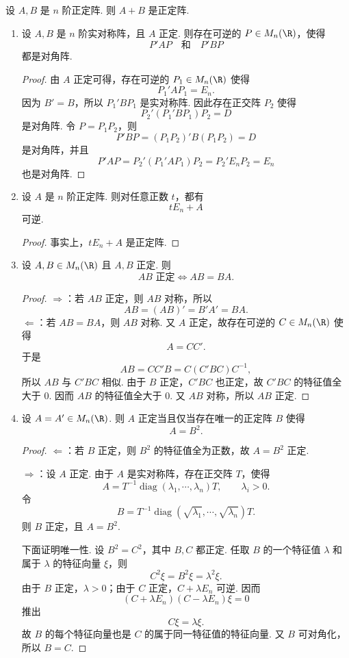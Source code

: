 \begin{lemma}
	设 $A,B$ 是 $n$ 阶正定阵. 则 $A+B$ 是正定阵.
\end{lemma}
\begin{example}
	\begin{enumerate}
		\item 设 $A,B$ 是 $n$ 阶实对称阵，且 $A$ 正定. 则存在可逆的 $P\in M_n(\R)$，使得
		\[
		P'AP\quad\text{和}\quad P'BP
		\]
		都是对角阵.
		\begin{proof}
			由 $A$ 正定可得，存在可逆的 $P_1\in M_n(\R)$ 使得
			\[
			P_1'AP_1=E_n.
			\]
			因为 $B'=B$，所以 $P_1'BP_1$ 是实对称阵. 因此存在正交阵 $P_2$ 使得
			\[
			P_2'(P_1'BP_1)P_2=D
			\]
			是对角阵. 令 $P=P_1P_2$，则
			\[
			P'BP=(P_1P_2)'B(P_1P_2)=D
			\]
			是对角阵，并且
			\[
			P'AP=P_2'(P_1'AP_1)P_2=P_2'E_nP_2=E_n
			\]
			也是对角阵.
		\end{proof}
		\item 设 $A$ 是 $n$ 阶正定阵. 则对任意正数 $t$，都有
		\[
		tE_n+A
		\]
		可逆.\begin{proof}
			事实上，$tE_n+A$ 是正定阵.
		\end{proof}
		\item 设 $A,B\in M_n(\R)$ 且 $A,B$ 正定. 则
		\[
		AB\text{ 正定}\Longleftrightarrow AB=BA.
		\]
		
		\begin{proof}
			$\Rightarrow$：若 $AB$ 正定，则 $AB$ 对称，所以
			\[
			AB=(AB)'=B'A'=BA.
			\]
			$\Leftarrow$：若 $AB=BA$，则 $AB$ 对称. 又 $A$ 正定，故存在可逆的 $C\in M_n(\R)$ 使得
			\[
			A=CC'.
			\]
			于是
			\[
			AB=CC'B=C(C'BC)C^{-1},
			\]
			所以 $AB$ 与 $C'BC$ 相似. 由于 $B$ 正定，$C'BC$ 也正定，故 $C'BC$ 的特征值全大于 $0$. 因而 $AB$ 的特征值全大于 $0$. 又 $AB$ 对称，所以 $AB$ 正定.
		\end{proof}
		\item 设 $A=A'\in M_n(\R)$. 则 $A$ 正定当且仅当存在唯一的正定阵 $B$ 使得
		\[
		A=B^2.
		\]
		\begin{proof}
			$\Leftarrow$：若 $B$ 正定，则 $B^2$ 的特征值全为正数，故 $A=B^2$ 正定.
			
			$\Rightarrow$：设 $A$ 正定. 由于 $A$ 是实对称阵，存在正交阵 $T$，使得
			\[
			A=T^{-1}\operatorname{diag}(\lambda_1,\cdots,\lambda_n)T,
			\qquad \lambda_i>0.
			\]
			令
			\[
			B=T^{-1}\operatorname{diag}(\sqrt{\lambda_1},\cdots,\sqrt{\lambda_n})T.
			\]
			则 $B$ 正定，且 $A=B^2$.
			
			下面证明唯一性. 设 $B^2=C^2$，其中 $B,C$ 都正定. 任取 $B$ 的一个特征值 $\lambda$ 和属于 $\lambda$ 的特征向量 $\xi$，则
			\[
			C^2\xi=B^2\xi=\lambda^2\xi.
			\]
			由于 $B$ 正定，$\lambda>0$；由于 $C$ 正定，$C+\lambda E_n$ 可逆. 因而
			\[
			(C+\lambda E_n)(C-\lambda E_n)\xi=0
			\]
			推出
			\[
			C\xi=\lambda\xi.
			\]
			故 $B$ 的每个特征向量也是 $C$ 的属于同一特征值的特征向量. 又 $B$ 可对角化，所以 $B=C$.
		\end{proof}
		
	\end{enumerate}
\end{example}

